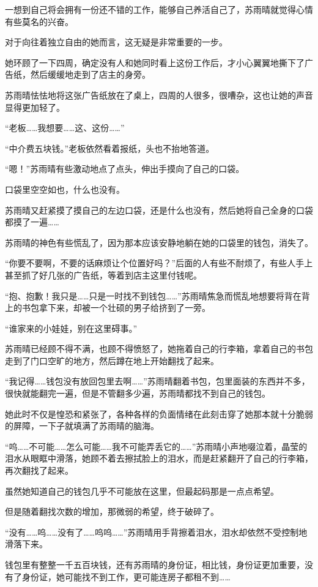 一想到自己将会拥有一份还不错的工作，能够自己养活自己了，苏雨晴就觉得心情有些莫名的兴奋。

对于向往着独立自由的她而言，这无疑是非常重要的一步。

她环顾了一下四周，确定没有人和她同时看上这份工作后，才小心翼翼地撕下了广告纸，然后缓缓地走到了店主的身旁。

苏雨晴怯怯地将这张广告纸放在了桌上，四周的人很多，很嘈杂，这也让她的声音显得更加轻了。

“老板……我想要……这、这份……”

“中介费五块钱。”老板依然看着报纸，头也不抬地答道。

“嗯！”苏雨晴有些激动地点了点头，伸出手摸向了自己的口袋。

口袋里空空如也，什么也没有。

苏雨晴又赶紧摸了摸自己的左边口袋，还是什么也没有，然后她将自己全身的口袋都摸了一遍……

苏雨晴的神色有些慌乱了，因为那本应该安静地躺在她的口袋里的钱包，消失了。

“你要不要啊，不要的话麻烦让个位置好吗？”后面的人有些不耐烦了，有些人手上甚至抓了好几张的广告纸，等着到店主这里付钱呢。

“抱、抱歉！我只是……只是一时找不到钱包……”苏雨晴焦急而慌乱地想要将背在背上的书包拿下来，却被一个壮硕的男子给挤到了一旁。

“谁家来的小娃娃，别在这里碍事。”

苏雨晴已经顾不得不满，也顾不得愤怒了，她拖着自己的行李箱，拿着自己的书包走到了门口空旷的地方，然后蹲在地上开始翻找了起来。

“我记得……钱包没有放回包里去啊……”苏雨晴翻着书包，包里面装的东西并不多，很快就能翻完一遍，但是不管翻多少遍，苏雨晴都找不到自己的钱包。

她此时不仅是惶恐和紧张了，各种各样的负面情绪在此刻击穿了她那本就十分脆弱的屏障，一下子就填满了苏雨晴的脑海。

“呜……不可能……怎么可能……我不可能弄丢它的……”苏雨晴小声地啜泣着，晶莹的泪水从眼眶中滑落，她顾不着去擦拭脸上的泪水，而是赶紧翻开了自己的行李箱，再次翻找了起来。

虽然她知道自己的钱包几乎不可能放在这里，但最起码那是一点点希望。

但是随着翻找次数的增加，那微弱的希望，终于破碎了。

“没有……呜……没有了……呜呜……”苏雨晴用手背擦着泪水，泪水却依然不受控制地滑落下来。

钱包里有整整一千五百块钱，还有苏雨晴的身份证，相比钱，身份证更加重要，没有了身份证，她可能找不到工作，更可能连房子都租不到……

